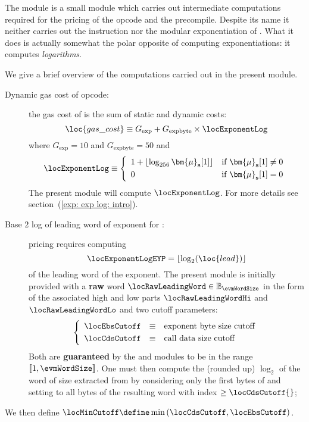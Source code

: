 The \expMod{} module is a small module which carries out intermediate computations required for the pricing of the  opcode and the \instModexp{} precompile.
Despite its name it neither carries out the  instruction nor the modular exponentiation of \instModexp{}.
What it does is actually somewhat the polar opposite of computing exponentiations: it computes \emph{logarithms}.

We give a brief overview of the computations carried out in the present module.
\begin{description}
	\item[Dynamic gas cost of  opcode:]
		the gas cost of  is the sum of static and dynamic costs:
		\[
			\loc{gas\_cost} \equiv G_\text{exp} + G_\text{expbyte} \times \locExponentLog \\
		\]
		where $G_\text{exp} = 10$ and $G_{\text{expbyte}} = 50$
		and
		\[
			\locExponentLog \equiv
			\left\{ \begin{array}{ll}
				1 + \lfloor \log_{256} \bm{\mu}_\textbf{s}[1] \rfloor & \text{if $\bm{\mu}_\textbf{s}[1] \neq 0$}  \vspace{1mm} \\
				0                                                     & \text{if $\bm{\mu}_\textbf{s}[1] = 0$}                  \\
			\end{array} \right. \\
		\]
		The present module will compute $\locExponentLog$. For more details see section~(\ref{exp: exp log: intro}).
	\item[Base $2$ log of leading word of exponent for \instModexp{}:]
		\instModexp{} pricing requires computing
		\[ \locExponentLogEYP = \lfloor \log_{2}(\loc{lead}) \rfloor \]
		of the leading word of the exponent.
		The present module is initially provided with a \textbf{raw} \evm{} word
		$\locRawLeadingWord \in \mathbb{B}_{\evmWordSize}$ in the form of the associated high and low parts
		$\locRawLeadingWordHi$ and $\locRawLeadingWordLo$
		  and two cutoff parameters:
		\[
			\left\{ \begin{array}{lcl}
				\locEbsCutoff & \equiv & \text{exponent byte size cutoff} \vspace{1mm} \\
				\locCdsCutoff & \equiv & \text{call data size cutoff}                  \\
			\end{array} \right.
		\]
		Both are \textbf{guaranteed} by the \hubMod{} and \oobMod{} modules to be in the range $[\![ 1, \evmWordSize ]\!]$.
		One must then compute the (rounded up) $\log_{2}$ of the word of size \locEbsCutoff{} extracted from  by considering only the first \locCdsCutoff{} bytes of  and setting to  all bytes of the resulting word with index $\geq \locCdsCutoff{}$;
\end{description}



We then define $\locMinCutoff \define \min{(\locCdsCutoff,\locEbsCutoff)}$.
